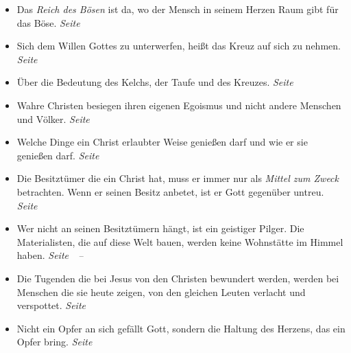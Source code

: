 \begin{itemize}
 \item Das \textit{Reich des Bösen} ist da, wo der Mensch in seinem Herzen Raum
gibt für das Böse.
 \dotfill \textit{Seite~\pageref{ref:03_04_reich_des_boesen}}\\

 \item Sich dem Willen Gottes zu unterwerfen, heißt das Kreuz auf sich zu
nehmen.
 \dotfill \textit{Seite~\pageref{ref:03_05_kreuz_auf_sich_nehmen}}\\

 \item Über die Bedeutung des Kelchs, der Taufe und des Kreuzes.
 \dotfill \textit{Seite~\pageref{ref:04_04_kelch_taufe_kreuz}}\\

 \item Wahre Christen besiegen ihren eigenen Egoismus und nicht andere Menschen
und Völker.
 \dotfill \textit{Seite~\pageref{ref:04_05_besigen}}\\

 \item Welche Dinge ein Christ erlaubter Weise genießen darf und wie er sie
genießen darf.
 \dotfill \textit{Seite~\pageref{ref:04_07_vorteile}}\\

 \item Die Besitztümer die ein Christ hat, muss er immer nur als \textit{Mittel
zum Zweck} betrachten. Wenn er seinen Besitz anbetet, ist er Gott gegenüber
untreu.
 \dotfill \textit{Seite~\pageref{ref:04_07_vorteile}}\\

 \item Wer nicht an seinen Besitztümern hängt, ist ein geistiger Pilger. Die
Materialisten, die auf diese Welt bauen, werden keine Wohnstätte im Himmel
haben.
 \dotfill
 \textit{Seite~\pageref{ref:04_10_pilger}~--~\pageref{ref:04_10_pilger_ende}}\\

 \item Die Tugenden die bei Jesus von den Christen bewundert werden, werden bei
Menschen die sie heute zeigen, von den gleichen Leuten verlacht und verspottet.
 \dotfill \textit{Seite~\pageref{ref:04_10_pilger}}\\

 \item Nicht ein Opfer an sich gefällt Gott, sondern die Haltung des Herzens, das
ein Opfer bring.
 \dotfill \textit{Seite~\pageref{ref:04_13_opfer}}\\


\end{itemize}
